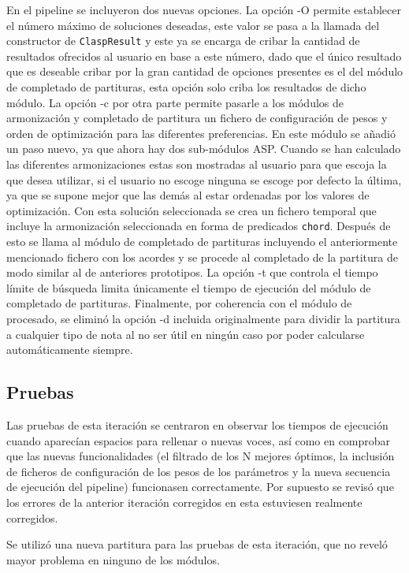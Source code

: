 En el pipeline se incluyeron dos nuevas opciones. La opción -O permite establecer el número máximo de soluciones deseadas, este valor se pasa a la llamada del constructor de \texttt{ClaspResult} y este ya se encarga de cribar la cantidad de resultados ofrecidos al usuario en base a este número, dado que el único resultado que es deseable cribar por la gran cantidad de opciones presentes es el del módulo de completado de partituras, esta opción solo criba los resultados de dicho módulo. La opción -c por otra parte permite pasarle a los módulos de armonización y completado de partitura un fichero de configuración de pesos y orden de optimización para las diferentes preferencias. En este módulo se añadió un paso nuevo, ya que ahora hay dos sub-módulos ASP. Cuando se han calculado las diferentes armonizaciones estas son mostradas al usuario para que escoja la que desea utilizar, si el usuario no escoge ninguna se escoge por defecto la última, ya que se supone mejor que las demás al estar ordenadas por los valores de optimización. Con esta solución seleccionada se crea un fichero temporal que incluye la armonización seleccionada en forma de predicados \texttt{chord}. Después de esto se llama al módulo de completado de partituras incluyendo el anteriormente mencionado fichero con los acordes y se procede al completado de la partitura de modo similar al de anteriores prototipos. La opción -t que controla el tiempo límite de búsqueda limita únicamente el tiempo de ejecución del módulo de completado de partituras. Finalmente, por coherencia con el módulo de procesado, se eliminó la opción -d incluida originalmente para dividir la partitura a cualquier tipo de nota al no ser útil en ningún caso por poder calcularse automáticamente siempre.

\subsection{Pruebas}
\label{subsec:eighth_iteration_test}
Las pruebas de esta iteración se centraron en observar los tiempos de ejecución cuando aparecían espacios para rellenar o nuevas voces, así como en comprobar que las nuevas funcionalidades (el filtrado de los N mejores óptimos, la inclusión de ficheros de configuración de los pesos de los parámetros y la nueva secuencia de ejecución del pipeline) funcionasen correctamente. Por supuesto se revisó que los errores de la anterior iteración corregidos en esta estuviesen realmente corregidos.

Se utilizó una nueva partitura para las pruebas de esta iteración, que no reveló mayor problema en ninguno de los módulos.

